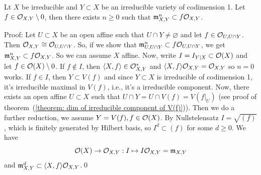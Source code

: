 \begin{dang}
    \begin{lemma}
        Lt $X$ be irreducible and $Y\subset X$ be an irreducible variety of codimension 1. Let 
        $f\in\mathcal{O}_{X,Y}\setminus0$, 
        then there exists $n\geq0$ such that $\mathfrak{m}_{X,Y}^n\subset f\mathcal{O}_{X,Y}$.
    \end{lemma}
\end{dang}
Proof: Let $U\subset X$ be an open affine such that $U\cap Y\neq\varnothing$ and let $f\in\mathcal{O}_{U,U\cap Y}$. Then 
$\mathcal{O}_{X,Y}\cong \mathcal{O}_{U,U\cap Y}$. So, if we show that 
$\mathfrak{m}_{U,U\cap Y}^n\subset f\mathcal{O}_{U,U\cap Y}$, we get 
$\mathfrak{m}_{X,Y}^n \subset f\mathcal{O}_{X,Y}$. So we can assume $X$ affine. 
Now, write 
$I = I_{Y|X}\subset \mathcal{O}(X)$ and let $f\in\mathcal{O}(X)\setminus0$. If $f\notin I$, then 
$\langle X,f\rangle\in \mathcal{O}_{X,Y}^*$ and $\langle X,f\rangle\mathcal{O}_{X,Y} = \mathcal{O}_{X,Y}$ so $n=0$ works. If 
$f\in I$, then $Y\subset V(f)$ and since $Y\subset X$ is irreducible of codimension 1, it's irreducible 
maximal in $V(f)$, i.e., it's a irreducible component. Now, there exists an open affine $U\subset X$ 
such that $U\cap Y= U\cap V(f)=V(f|_U)$ (see proof of theorem~(\ref{theorem: dim of irreducible component of V(f)})). 
Then we do a further reduction, we assume $Y=V(f), f \in \mathcal{O}(X)$. By Nullstelensatz 
$I=\sqrt{(f)}$, which is finitely generated by Hilbert basis, so $I^d\subset (f)$ for some $d\geq0$. We have 
\begin{equation}
    \mathcal{O}(X)\to \mathcal{O}_{X,Y}:I\mapsto I\mathcal{O}_{X,Y}=\mathfrak{m}_{X,Y}
\end{equation}
and $\mathfrak{m}_{X,Y}^d\subset \langle X,f\rangle\mathcal{O}_{X,Y}$.\qed



